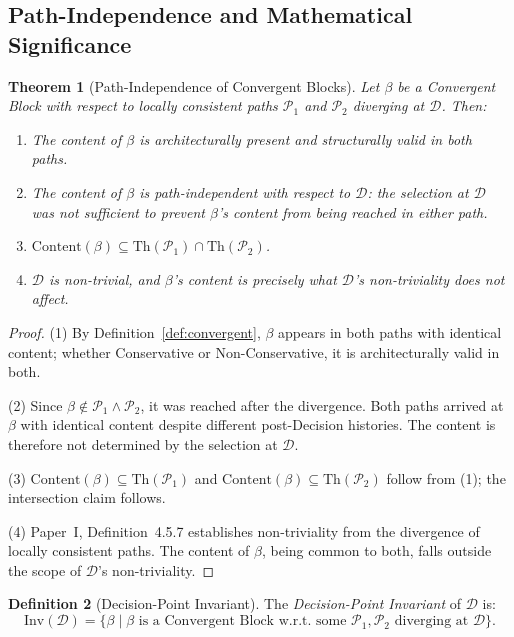 \documentclass[12pt, a4paper]{article}
\theoremstyle{plain}
\newtheorem{theorem}{Theorem}[section]
\theoremstyle{definition}
\newtheorem{definition}[theorem]{Definition}
\theoremstyle{remark}
\newcommand{\Th}[1]{\mathrm{Th}(#1)}
\newcommand{\Inv}[1]{\mathrm{Inv}(#1)}
\begin{document}
\subsection{Path-Independence and Mathematical Significance}
\label{subsec:path-indep}

\begin{theorem}[Path-Independence of Convergent Blocks]
\label{thm:path-indep}
Let $\beta$ be a Convergent Block with respect to locally consistent
paths $\mathcal{P}_1$ and $\mathcal{P}_2$ diverging at $\mathcal{D}$.
Then:
\begin{enumerate}
  \item The content of $\beta$ is architecturally present and
        structurally valid in both paths.
  \item The content of $\beta$ is \emph{path-independent} with
        respect to $\mathcal{D}$: the selection at $\mathcal{D}$
        was not sufficient to prevent $\beta$'s content from being
        reached in either path.
  \item $\mathrm{Content}(\beta) \subseteq
        \Th{\mathcal{P}_1} \cap \Th{\mathcal{P}_2}$.
  \item $\mathcal{D}$ is non-trivial, and $\beta$'s content is
        precisely what $\mathcal{D}$'s non-triviality does
        \emph{not} affect.
\end{enumerate}
\end{theorem}

\begin{proof}
(1) By Definition~\ref{def:convergent}, $\beta$ appears in both
paths with identical content; whether Conservative or Non-Conservative,
it is architecturally valid in both.

(2) Since $\beta \notin \mathcal{P}_1 \wedge \mathcal{P}_2$, it was
reached after the divergence. Both paths arrived at $\beta$ with
identical content despite different post-Decision histories. The
content is therefore not determined by the selection at $\mathcal{D}$.

(3) $\mathrm{Content}(\beta) \subseteq \Th{\mathcal{P}_1}$ and
$\mathrm{Content}(\beta) \subseteq \Th{\mathcal{P}_2}$ follow from
(1); the intersection claim follows.

(4) Paper~I, Definition~4.5.7 establishes non-triviality from the
divergence of locally consistent paths. The content of $\beta$, being
common to both, falls outside the scope of $\mathcal{D}$'s
non-triviality.
\end{proof}

\begin{definition}[Decision-Point Invariant]
\label{def:dpi}
The \emph{Decision-Point Invariant} of $\mathcal{D}$ is:
\[
  \Inv{\mathcal{D}}
  = \bigl\{\beta \;\big|\; \beta \text{ is a Convergent Block
    w.r.t.\ some }
    \mathcal{P}_1, \mathcal{P}_2 \text{ diverging at }
    \mathcal{D}\bigr\}.
\]
\end{definition}
\end{document}
